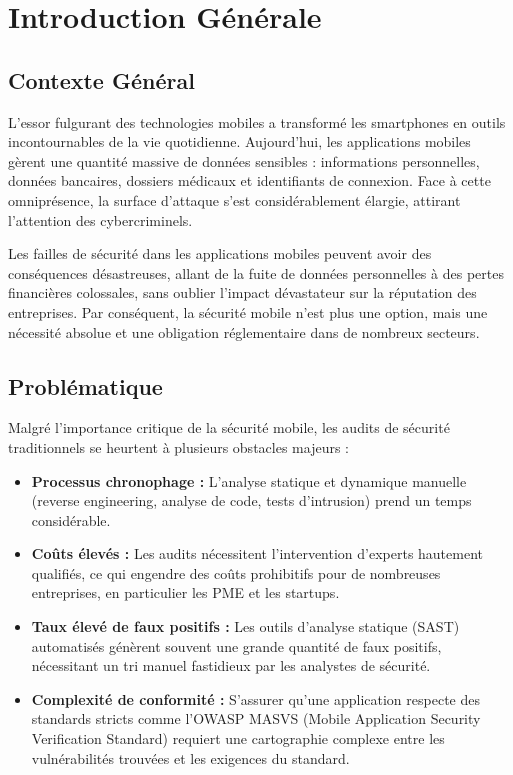 \chapter{Introduction Générale}
\label{chap:intro}

\section{Contexte Général}
L'essor fulgurant des technologies mobiles a transformé les smartphones en outils incontournables de la vie quotidienne. Aujourd'hui, les applications mobiles gèrent une quantité massive de données sensibles : informations personnelles, données bancaires, dossiers médicaux et identifiants de connexion. Face à cette omniprésence, la surface d'attaque s'est considérablement élargie, attirant l'attention des cybercriminels.

Les failles de sécurité dans les applications mobiles peuvent avoir des conséquences désastreuses, allant de la fuite de données personnelles à des pertes financières colossales, sans oublier l'impact dévastateur sur la réputation des entreprises. Par conséquent, la sécurité mobile n'est plus une option, mais une nécessité absolue et une obligation réglementaire dans de nombreux secteurs.

\section{Problématique}
Malgré l'importance critique de la sécurité mobile, les audits de sécurité traditionnels se heurtent à plusieurs obstacles majeurs :

\begin{itemize}[label=\textcolor{PrimaryBlue}{\faBug}]
    \item \textbf{Processus chronophage :} L'analyse statique et dynamique manuelle (reverse engineering, analyse de code, tests d'intrusion) prend un temps considérable.
    \item \textbf{Coûts élevés :} Les audits nécessitent l'intervention d'experts hautement qualifiés, ce qui engendre des coûts prohibitifs pour de nombreuses entreprises, en particulier les PME et les startups.
    \item \textbf{Taux élevé de faux positifs :} Les outils d'analyse statique (SAST) automatisés génèrent souvent une grande quantité de faux positifs, nécessitant un tri manuel fastidieux par les analystes de sécurité.
    \item \textbf{Complexité de conformité :} S'assurer qu'une application respecte des standards stricts comme l'OWASP MASVS (Mobile Application Security Verification Standard) requiert une cartographie complexe entre les vulnérabilités trouvées et les exigences du standard.
\end{itemize}

